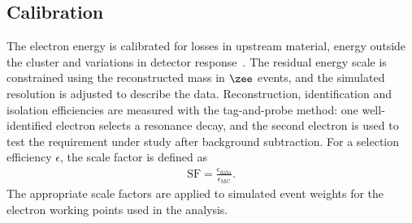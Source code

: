 \subsection{Calibration}

The electron energy is calibrated for losses in upstream material, energy outside the cluster and variations in detector response~\cite{ATLAS2019ElectronPerformance}.
The residual energy scale is constrained using the reconstructed mass in $\zee$ events, and the simulated resolution is adjusted to describe the data.
Reconstruction, identification and isolation efficiencies are measured with the tag-and-probe method: one well-identified electron selects a resonance decay, and the second electron is used to test the requirement under study after background subtraction.
For a selection efficiency $\epsilon$, the scale factor is defined as
\begin{align}
    \mathrm{SF}=\frac{\epsilon_{\mathrm{data}}}{\epsilon_{\mathrm{MC}}}.
    \label{eq:ch6_efficiency_sf}
\end{align}
The appropriate scale factors are applied to simulated event weights for the electron working points used in the analysis.
